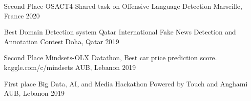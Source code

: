 \begin{cvhonors}

  \cvhonor
    {Second Place} %
    {OSACT4-Shared task on Offensive Language Detection} %
    {Marseille, France} %
    {2020} %

  \cvhonor
    {Best Domain Detection system } %
    {Qatar International Fake News Detection and Annotation Contest} %
    {Doha, Qatar} %
    {2019} %

  \cvhonor
    {Second Place} %
    {Mindsets-OLX Datathon, Best car price prediction score. kaggle.com/c/mindsets} %
    {AUB, Lebanon} %
    {2019} %

  \cvhonor
    {First place} %
    {Big Data, AI, and Media Hackathon Powered by Touch and Anghami} %
    {AUB, Lebanon} %
    {2019} %


\end{cvhonors}

